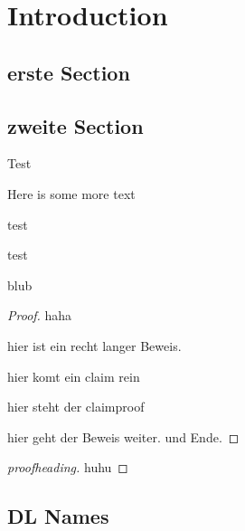 \chapter{Introduction}
\label{ch:introduction}




\section{erste Section}
\label{sec:erste-section}


\section{zweite Section}
\label{sec:zweite-section}

\blindtext

\begin{definition}
  Test
\end{definition}

Here is some more text

\begin{definition}
  test
\end{definition}

\begin{theorem*}[thmtitel]
  test
\end{theorem*}

\blindtext

\begin{theorem}
  blub
\end{theorem}

\begin{proof}
  haha

  hier ist ein recht langer Beweis.

  \blindtext

  \begin{claim}
    hier komt ein claim rein
  \end{claim}

  \begin{claimproof}{}
    hier steht der claimproof
  \end{claimproof}
  
  hier geht der Beweis weiter. \blindtext
  und Ende.
\end{proof}

\blindtext

\begin{proof}[proofheading]
  huhu
\end{proof}

\section{DL Names}
\label{sec:dl-names}

\ALCALC \SHOIQSHOIQ